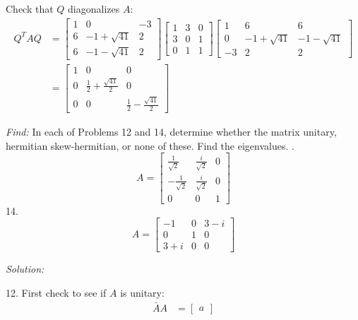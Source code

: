 \documentclass[11pt]{homework}
\begin{document}
Check that $Q$ diagonalizes $A$:
\begin{align*}
Q^T A Q &=
  \begin{bmatrix}
  1 & 0 & -3 \\
  6 & -1+\sqrt{41} & 2 \\
  6 & -1-\sqrt{41} & 2 
  \end{bmatrix}
  \begin{bmatrix}
  1 & 3 & 0 \\
  3 & 0 & 1 \\
  0 & 1 & 1
  \end{bmatrix}
  \begin{bmatrix}
  1 & 6 & 6 \\
  0 & -1+\sqrt{41} & -1-\sqrt{41} \\
  -3 & 2 & 2
  \end{bmatrix} \\
  &=
  \begin{bmatrix}
  1 & 0 & 0 \\
  0 & \frac{1}{2}+\frac{\sqrt{41}}{2} & 0 \\
  0 & 0 & \frac{1}{2}-\frac{\sqrt{41}}{2}
  \end{bmatrix}
\end{align*}

\emph{Find:}
\newline
In each of Problems 12 and 14, 
determine whether the matrix unitary, hermitian
skew-hermitian, or none of these.
Find the eigenvalues.
.
\begin{equation*}
  A = 
  \begin{bmatrix}
  \frac{1}{\sqrt{2}} & \frac{i}{\sqrt{2}} & 0 \\
  -\frac{1}{\sqrt{2}} & \frac{i}{\sqrt{2}} & 0 \\
  0 & 0 & 1
  \end{bmatrix}
\end{equation*}
14. 
\begin{equation*}
A = 
  \begin{bmatrix}
  -1 & 0 & 3-i \\
  0 & 1 & 0 \\
  3+i & 0 & 0
  \end{bmatrix}
\end{equation*}

\emph{Solution:}
\newline

12. First check to see if $A$ is unitary:
\begin{align*}
\bar{A}A &=
  \begin{bmatrix}
  a
  \end{bmatrix}
\end{align*}
\end{document}
